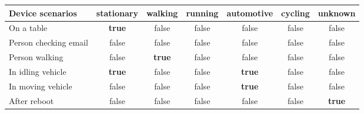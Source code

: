 \begin{tabular}{l|c|ccccc}
Device scenarios & stationary & walking & running & automotive & cycling & unknown \\
\hline
On a table & \textbf{true} & false & false & false & false & false\\
Person checking email & false & false & false & false & false & false\\
Person walking & false & \textbf{true} & false & false & false & false\\
In idling vehicle & \textbf{true} & false & false & \textbf{true} & false & false\\
In moving vehicle & false & false & false & \textbf{true} & false & false\\
After reboot & false & false & false & false & false & \textbf{true}
\end{tabular}
